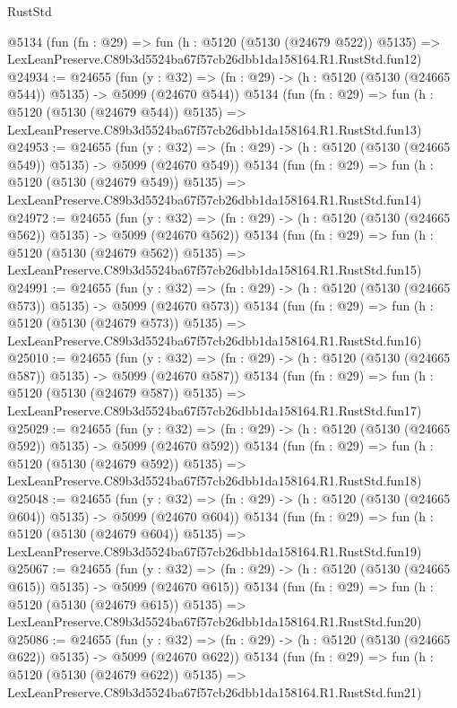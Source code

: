 \begin{lexlean}{RustStd}
\begin{coremodule}
    @5134
    (fun (fn : @29) =>
    fun (h : @5120 (@5130 (@24679 @522)) @5135) =>
    LexLeanPreserve.C89b3d5524ba67f57cb26dbb1da158164.R1.RustStd.fun12)
@24934 := @24655
    (fun (y : @32) => (fn : @29) -> (h : @5120 (@5130 (@24665 @544)) @5135) -> @5099 (@24670 @544))
    @5134
    (fun (fn : @29) =>
    fun (h : @5120 (@5130 (@24679 @544)) @5135) =>
    LexLeanPreserve.C89b3d5524ba67f57cb26dbb1da158164.R1.RustStd.fun13)
@24953 := @24655
    (fun (y : @32) => (fn : @29) -> (h : @5120 (@5130 (@24665 @549)) @5135) -> @5099 (@24670 @549))
    @5134
    (fun (fn : @29) =>
    fun (h : @5120 (@5130 (@24679 @549)) @5135) =>
    LexLeanPreserve.C89b3d5524ba67f57cb26dbb1da158164.R1.RustStd.fun14)
@24972 := @24655
    (fun (y : @32) => (fn : @29) -> (h : @5120 (@5130 (@24665 @562)) @5135) -> @5099 (@24670 @562))
    @5134
    (fun (fn : @29) =>
    fun (h : @5120 (@5130 (@24679 @562)) @5135) =>
    LexLeanPreserve.C89b3d5524ba67f57cb26dbb1da158164.R1.RustStd.fun15)
@24991 := @24655
    (fun (y : @32) => (fn : @29) -> (h : @5120 (@5130 (@24665 @573)) @5135) -> @5099 (@24670 @573))
    @5134
    (fun (fn : @29) =>
    fun (h : @5120 (@5130 (@24679 @573)) @5135) =>
    LexLeanPreserve.C89b3d5524ba67f57cb26dbb1da158164.R1.RustStd.fun16)
@25010 := @24655
    (fun (y : @32) => (fn : @29) -> (h : @5120 (@5130 (@24665 @587)) @5135) -> @5099 (@24670 @587))
    @5134
    (fun (fn : @29) =>
    fun (h : @5120 (@5130 (@24679 @587)) @5135) =>
    LexLeanPreserve.C89b3d5524ba67f57cb26dbb1da158164.R1.RustStd.fun17)
@25029 := @24655
    (fun (y : @32) => (fn : @29) -> (h : @5120 (@5130 (@24665 @592)) @5135) -> @5099 (@24670 @592))
    @5134
    (fun (fn : @29) =>
    fun (h : @5120 (@5130 (@24679 @592)) @5135) =>
    LexLeanPreserve.C89b3d5524ba67f57cb26dbb1da158164.R1.RustStd.fun18)
@25048 := @24655
    (fun (y : @32) => (fn : @29) -> (h : @5120 (@5130 (@24665 @604)) @5135) -> @5099 (@24670 @604))
    @5134
    (fun (fn : @29) =>
    fun (h : @5120 (@5130 (@24679 @604)) @5135) =>
    LexLeanPreserve.C89b3d5524ba67f57cb26dbb1da158164.R1.RustStd.fun19)
@25067 := @24655
    (fun (y : @32) => (fn : @29) -> (h : @5120 (@5130 (@24665 @615)) @5135) -> @5099 (@24670 @615))
    @5134
    (fun (fn : @29) =>
    fun (h : @5120 (@5130 (@24679 @615)) @5135) =>
    LexLeanPreserve.C89b3d5524ba67f57cb26dbb1da158164.R1.RustStd.fun20)
@25086 := @24655
    (fun (y : @32) => (fn : @29) -> (h : @5120 (@5130 (@24665 @622)) @5135) -> @5099 (@24670 @622))
    @5134
    (fun (fn : @29) =>
    fun (h : @5120 (@5130 (@24679 @622)) @5135) =>
    LexLeanPreserve.C89b3d5524ba67f57cb26dbb1da158164.R1.RustStd.fun21)

\end{coremodule}
\end{lexlean}
